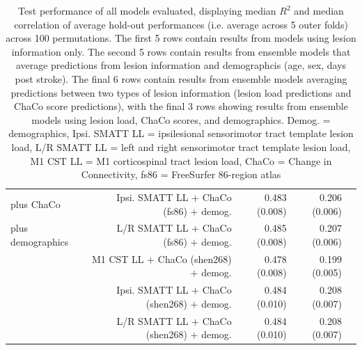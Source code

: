 \documentclass[10pt]{article}
\def\Plus{\texttt{+}}
\begin{document}
\begin{table}[h]
\begin{tabular}{lrrrr}
 plus ChaCo & Ipsi. SMATT LL $\Plus$ ChaCo  (fs86) $\Plus$ demog. & 0.483 (0.008) & 0.206 (0.006) \\
 plus demographics & L/R SMATT LL $\Plus$ ChaCo  (fs86) $\Plus$ demog. & 0.485 (0.008) & 0.207 (0.006) \\
 & M1 CST LL $\Plus$ ChaCo  (shen268) $\Plus$ demog. & 0.478 (0.008) & 0.199 (0.005) \\
 & Ipsi. SMATT LL $\Plus$ ChaCo  (shen268) $\Plus$ demog. & 0.484 (0.010) & 0.208 (0.007) \\
 & L/R SMATT LL $\Plus$ ChaCo  (shen268) $\Plus$ demog. & 0.484 (0.010) & 0.208 (0.007) \\
\bottomrule
\end{tabular}

\caption{Test performance of all models evaluated, displaying median $R^2$ and median correlation of average hold-out performances (i.e. average across 5 outer folds) across 100 permutations. The first 5 rows contain results from models using lesion information only. The second 5 rows contain results from ensemble models that average predictions from lesion information and demographcis (age, sex, days post stroke). The final 6 rows contain results from ensemble models averaging predictions between two types of lesion information (lesion load predictions and ChaCo score predictions), with the final 3 rows showing results from ensemble models using lesion load, ChaCo scores, and demographics. Demog. = demographics, Ipsi. SMATT LL = ipsilesional sensorimotor tract template lesion load, L/R SMATT LL = left and right sensorimotor tract template lesion load, M1 CST LL = M1 corticospinal tract lesion load, ChaCo = Change in Connectivity, fs86 = FreeSurfer 86-region atlas}
\end{table}
\end{document}
